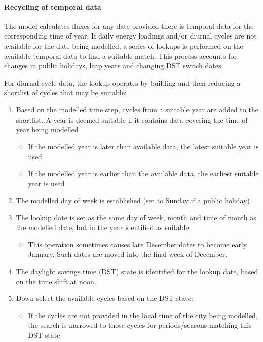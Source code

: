 \documentclass[letterpaper,10pt,english]{sphinxmanual}
\begin{document}
\paragraph{Recycling of temporal data}
\label{\detokenize{OtherManuals/GQF_Manual:recycling-of-temporal-data}}
The model calculates fluxes for any date provided there is temporal data
for the corresponding time of year. If daily energy loadings and/or
diurnal cycles are not available for the date being modelled, a series
of lookups is performed on the available temporal data to find a
suitable match. This process accounts for changes in public holidays,
leap years and changing DST switch dates.

For diurnal cycle data, the lookup operates by building and then
reducing a shortlist of cycles that may be suitable:
\begin{enumerate}
\item {} 
Based on the modelled time step, cycles from a suitable year are
added to the shortlist. A year is deemed suitable if it contains data
covering the time of year being modelled
\begin{itemize}
\item {} 
If the modelled year is later than available data, the latest
suitable year is used

\item {} 
If the modelled year is earlier than the available data, the
earliest suitable year is used

\end{itemize}

\item {} 
The modelled day of week is established (set to Sunday if a public
holiday)

\item {} 
The lookup date is set as the same day of week, month and time of
month as the modelled date, but in the year identified as suitable.
\begin{itemize}
\item {} 
This operation sometimes causes late December dates to become
early January. Such dates are moved into the final week of
December.

\end{itemize}

\item {} 
The daylight savings time (DST) state is identified for the lookup
date, based on the time shift at noon.

\item {} 
Down-select the available cycles based on the DST state:
\begin{itemize}
\item {} 
If the cycles are not provided in the local time of the city being
modelled, the search is narrowed to those cycles for
periods/seasons matching this DST state


\end{itemize}
\end{enumerate}
\end{document}
